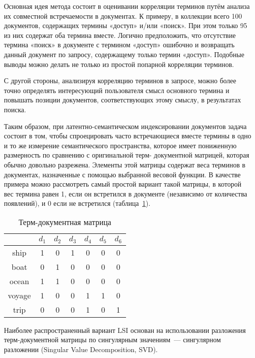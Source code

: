 Основная идея метода состоит в оценивании корреляции терминов путём анализа их совместной встречаемости в документах. К примеру, в коллекции всего 100 документов, содержащих термины «доступ» и/или «поиск». При этом только 95 из них содержат оба термина вместе. Логично предположить, что отсутствие термина «поиск» в документе с термином «доступ» ошибочно и возвращать данный документ по запросу, содержащему только термин «доступ». Подобные выводы можно делать не только из простой попарной корреляции терминов. 

С другой стороны, анализируя корреляцию терминов в запросе, можно более точно определять интересующий пользователя смысл основного термина и повышать позиции документов, соответствующих этому смыслу, в результатах поиска.
 
Таким образом, при латентно-семантическом индексировании документов задача состоит в том, чтобы спроецировать часто встречающиеся вместе термины в одно и то же измерение семантического пространства, которое имеет пониженную размерность по сравнению с оригинальной терм- документной матрицей, которая обычно довольно разрежена. Элементы этой матрицы содержат веса терминов в документах, назначенные с помощью выбранной весовой функции. В качестве примера можно рассмотреть самый простой вариант такой матрицы, в которой вес термина равен 1, если он встретился в документе (независимо от количества появлений), и 0 если не встретился (таблица~\ref{td_matr}).
 
\begin{table}[h]
\caption{Терм-документная матрица}
\label{td_matr}
\centering
\begin{tabular}{c|cccccc}
 & $d_1$ & $d_2$ & $d_3$ & $d_4$ & $d_5$ & $d_6$ \\
\hline
ship & 1 & 0 & 1 & 0 & 0 & 0 \\
boat & 0 & 1 & 0 & 0 & 0 & 0 \\
ocean & 1 & 1 & 0 & 0 & 0 & 0 \\
voyage & 1 & 0 & 0 & 1 & 1 & 0 \\
trip & 0 & 0 & 0 & 1 & 0 & 1 \\
\end{tabular}
\end{table}

Наиболее распространенный вариант LSI основан на использовании разложения терм-документной матрицы по сингулярным значениям~--- сингулярном разложении (Singular Value Decomposition, SVD). 


